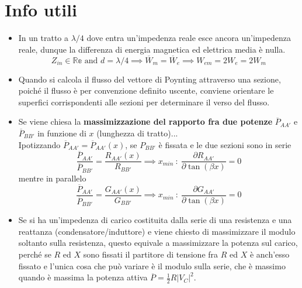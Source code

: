 \documentclass{book}
\begin{document}
    \section*{Info utili}
        \begin{itemize}
            \item In un tratto a $\lambda/4$ dove entra un'impedenza reale esce ancora un'impedenza reale,
            dunque la differenza di energia magnetica ed elettrica media è nulla.
            \begin{equation}
                Z_{in} \in \mathbb{Re} \textrm{ and } d= \lambda/4 \implies \overline{W}_{m}=\overline{W}_{e} \implies W_{em} = 2W_{e}=2W_{m}
            \end{equation}
            \item Quando si calcola il flusso del vettore di Poynting attraverso una sezione, poiché il flusso è per 
            convenzione definito uscente, conviene orientare le superfici corrispondenti alle sezioni per determinare il verso del flusso.
            \item Se viene chiesa la \textbf{massimizzazione del rapporto fra due potenze} $\overline{P}_{AA'}$ e $\overline{P}_{BB'}$ in funzione di $x$ (lunghezza di tratto)... \\
            Ipotizzando $\overline{P}_{AA'}=\overline{P}_{AA'}(x)$, se $P_{BB'}$ è fissata e le due sezioni sono in serie
            \begin{equation}
                \frac{\overline{P}_{AA'}}{\overline{P}_{BB'}} = \frac{R_{AA'}(x)}{R_{BB'}} \implies x_{min} \ :\  \frac{\partial R_{AA'}}{\partial \tan(\beta x)} = 0
            \end{equation}
            mentre in parallelo
            \begin{equation}
                \frac{\overline{P}_{AA'}}{\overline{P}_{BB'}}=\frac{G_{AA'}(x)}{G_{BB'}} \implies x_{min} \ : \ \frac{\partial G_{AA'}}{\partial \tan(\beta x)} = 0
            \end{equation}
            \item Se si ha un'impedenza di carico costituita dalla serie di una resistenza e una reattanza (condensatore/induttore) e 
            viene chiesto di massimizzare il modulo soltanto sulla resistenza, questo equivale a massimizzare la potenza sul carico, perché se $R$ ed $X$ 
            sono fissati il partitore di tensione fra $R$ ed $X$ è anch'esso fissato e l'unica cosa che può variare è il modulo sulla serie, che è massimo quando è
            massima la potenza  attiva $\overline{P}=\frac{1}{2}R|V_{C}|^{2}$.
        \end{itemize}
        
\end{document}
